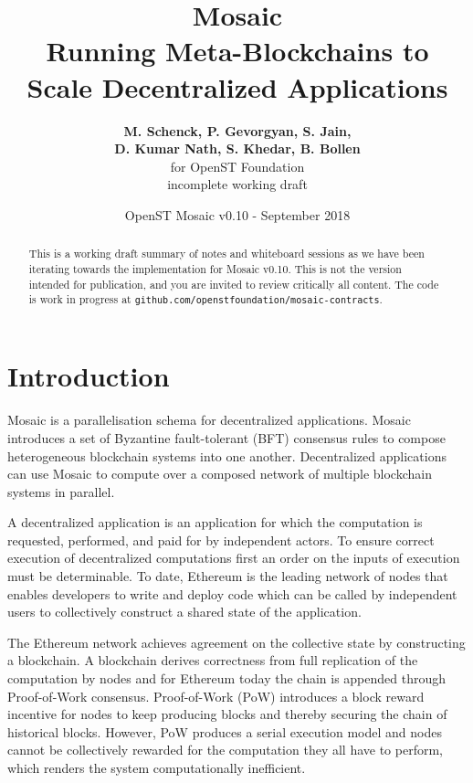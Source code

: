\documentclass[12pt,a4paper]{article}
\title{Mosaic\\\sc\Large{Running Meta-Blockchains to \\ Scale Decentralized Applications}}
\author{\textbf{M. Schenck, P. Gevorgyan, S. Jain,}\\ \textbf{D. Kumar Nath, S. Khedar, B. Bollen}\\ for OpenST Foundation \\ incomplete working draft}
\date{OpenST Mosaic v0.10 - September 2018}
\begin{document}
\maketitle

\begin{abstract}
This is a working draft summary of notes and whiteboard sessions as we have been iterating towards the implementation for Mosaic v0.10.
This is not the version intended for publication, and you are invited to review critically all content.
The code is work in progress at \verb|github.com/openstfoundation/mosaic-contracts|.
\end{abstract}

%
%
\section{Introduction}

Mosaic is a parallelisation schema for decentralized applications.
Mosaic introduces a set of Byzantine fault-tolerant (BFT) consensus rules to compose heterogeneous blockchain systems into one another.
Decentralized applications can use Mosaic to compute over a composed network of multiple blockchain systems in parallel.

A decentralized application is an application for which the computation is requested, performed, and paid for by independent actors.
To ensure correct execution of decentralized computations first an order on the inputs of execution must be determinable.
To date, Ethereum is the leading network
of nodes that enables developers to write and deploy code which can be called by independent users to collectively construct a shared state of the application.

The Ethereum network achieves agreement on the collective state by constructing a blockchain.
A blockchain derives correctness from full replication of the computation by nodes and for Ethereum today the chain is appended through Proof-of-Work consensus.
Proof-of-Work (PoW) introduces a block reward incentive for nodes to keep producing blocks and thereby securing the chain of historical blocks.
However, PoW produces a serial execution model and nodes cannot be collectively rewarded for the computation they all have to perform, which renders the system computationally inefficient\cite{verifiersdilemma}.
\end{document}
